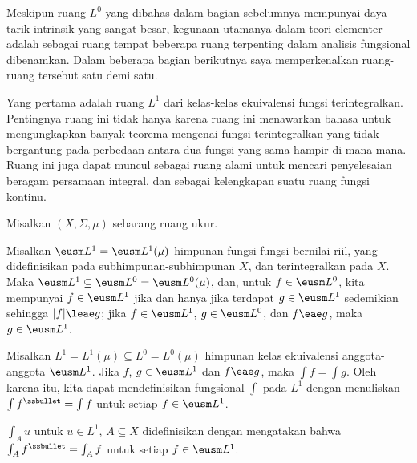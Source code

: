 
\def\chaptername{Ruang fungsi}
\def\sectionname{$L^1$}


Meskipun ruang $L^0$ yang dibahas dalam bagian sebelumnya mempunyai daya
tarik intrinsik yang sangat besar, kegunaan utamanya dalam teori elementer
adalah sebagai ruang tempat beberapa ruang terpenting dalam analisis
fungsional dibenamkan. Dalam beberapa bagian berikutnya saya memperkenalkan
ruang-ruang tersebut satu demi satu.

Yang pertama adalah ruang $L^1$ dari kelas-kelas ekuivalensi fungsi
terintegralkan. Pentingnya ruang ini tidak hanya karena ruang ini menawarkan
bahasa untuk mengungkapkan banyak teorema mengenai fungsi terintegralkan yang
tidak bergantung pada perbedaan antara dua fungsi yang sama hampir di
mana-mana. Ruang ini juga dapat muncul sebagai ruang alami untuk mencari
penyelesaian beragam persamaan integral, dan sebagai kelengkapan suatu ruang
fungsi kontinu.

 Misalkan $(X,\Sigma,\mu)$ sebarang
ruang ukur.

 Misalkan $\eusm L^1=\eusm L^1(\mu)$ himpunan
fungsi-fungsi bernilai riil, yang didefinisikan pada subhimpunan-subhimpunan
$X$, dan terintegralkan pada $X$. Maka
$\eusm L^1\subseteq\eusm L^0=\eusm L^0(\mu)$, dan, untuk $f\in\eusm L^0$, kita mempunyai
$f\in\eusm L^1$ jika dan hanya jika terdapat $g\in\eusm L^1$ sedemikian sehingga
$|f|\leae g$; jika $f\in\eusm L^1$, $g\in\eusm L^0$, dan $f\eae g$,
maka $g\in\eusm L^1$. 


 Misalkan $L^1=L^1(\mu)\subseteq L^0=L^0(\mu)$
himpunan kelas ekuivalensi anggota-anggota $\eusm L^1$. Jika $f$,
$g\in\eusm L^1$ dan $f\eae g$, maka $\int f=\int g$.
Oleh karena itu, kita dapat mendefinisikan fungsional $\int$ pada $L^1$
dengan menuliskan $\int f^{\ssbullet}=\int f$ untuk setiap
$f\in\eusm L^1$.

 $\int_Au$ untuk $u\in L^1$, $A\subseteq X$ didefinisikan dengan mengatakan bahwa
$\int_Af^{\ssbullet}=\int_Af$ untuk setiap $f\in\eusm L^1$.

